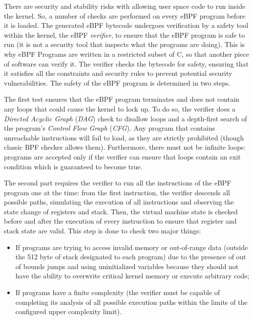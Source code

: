 There are security and stability risks with allowing user space code to run inside the kernel. 
So, a number of checks are performed on every eBPF program before it is loaded. 
The generated eBPF bytecode undergoes verification by a safety tool within the kernel, the eBPF \textit{verifier}, to ensure that the eBPF program is safe to run (it is not a security tool that inspects what the programs are doing).
This is why eBPF Programs are written in a restricted subset of C, so that another piece of software can verify it.
The verifier checks the bytecode for safety, ensuring that it satisfies all the constraints and security rules to prevent potential security vulnerabilities.
The safety of the eBPF program is determined in two steps.

The first test ensures that the eBPF program terminates and does not contain any loops that could cause the kernel to lock up. 
To do so, the verifier does a \textit{Directed Acyclic Graph} (\textit{DAG}) check to disallow loops and a depth-first search of the program's \textit{Control Flow Graph} (\textit{CFG}). 
Any program that contains unreachable instructions will fail to load, as they are strictly prohibited (though classic BPF checker allows them).
Furthermore, there must not be infinite loops: programs are accepted only if the verifier can ensure that loops contain an exit condition which is guaranteed to become true.

The second part requires the verifier to run all the instructions of the eBPF program one at the time: from the first instruction, the verifier descends all possible paths, simulating the execution of all instructions and observing the state change of registers and stack.
Then, the virtual machine state is checked before and after the execution of every instruction to ensure that register and stack state are valid. 
This step is done to check two major things: 

\begin{itemize}
	\item 
		If programs are trying to access invalid memory or out-of-range data (outside the 512 byte of stack designated to each program) due to the presence of out of bounds jumps and using uninitialized variables because they should not have the ability to overwrite critical kernel memory or execute arbitrary code;
	\item 
		If programs have a finite complexity (the verifier must be capable of completing its analysis of all possible execution paths within the limits of the configured upper complexity limit).
\end{itemize}

